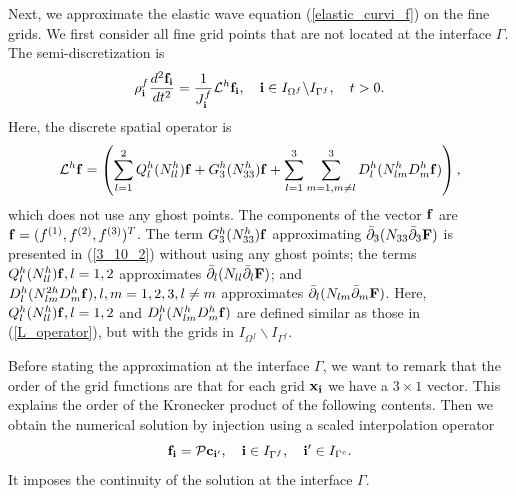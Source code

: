 Next, we approximate the elastic wave equation (\ref{elastic_curvi_f}) on the fine grids. We first consider all fine grid points that are not located at the interface $\Gamma$. The semi-discretization  is
\begin{equation}\label{elastic_semi_f}
{\rho}_{\bf i}^{f}\frac{d^2{{\bf f}_{\bf i}}}{dt^2} = \frac{1}{J^f_{\bf i}}{\mathcal{L}}^{h} {{\bf f}}_{\bf i},\quad {\bf i}\in I_{\Omega^f}\backslash I_{{\Gamma^f}},\quad t>0.
\end{equation}
Here, the discrete spatial operator is
\begin{equation}\label{Lf_operator}
{\mathcal{L}}^{h} {{\bf f}} = \left(\sum_{l=1}^2{Q}_l^{h}({N}_{ll}^h){\bf f}+{G}_3^{h}({N}_{33}^h){\bf f}+\sum_{l=1}^3\sum_{m=1,m\neq l}^3{D}_l^{h}({N}_{lm}^{h}{D}_m^{h}{\bf f})\right),
\end{equation}
{\color{red} which does not use any ghost points. The components of the vector ${\bf f}$ are ${\bf f} = (f^{(1)}, f^{(2)}, f^{(3)})^T$. The term ${G}_3^{h}(N_{33}^{h}){\bf f}$ approximating $\bar{\partial}_3(N_{33}\bar{\partial}_3 {\bf F})$ is presented in (\ref{3_10_2}) without using any ghost points; the terms $Q_l^{h}(N_{ll}^{h}){\bf f}, l = 1,2$ approximates $\bar{\partial}_l(N_{ll}\bar{\partial}_l{\bf F})$; and $D_{l}^{h}(N_{lm}^{2h}D_m^{h}{\bf f}), l,m = 1,2,3, l\neq m$ approximates  $\bar{\partial}_l(N_{lm}\bar{\partial}_m {\bf F})$. Here, ${Q}_l^{h}({N}_{ll}^h){\bf f}, l = 1,2$ and ${D}_l^{h}({N}_{lm}^{h}{D}_m^{h}{\bf f})$ are defined similar as those in (\ref{L_operator}), but with the grids in $I_{\Omega^f}\backslash I_{{\Gamma^f}}$.}

{\color{red} Before stating the approximation at the interface $\Gamma$, we want to remark that the order of the grid functions are that for each grid ${\bf x}_{\bf i}$ we have a $3\times 1$ vector. This explains the order of the Kronecker product of the following contents.} Then we obtain the numerical solution by injection using a scaled interpolation operator
\begin{equation}\label{continuous_sol}
{\bf f}_{\bf i} = {\mathcal{P}}{\bf c}_{{\bf i}'},\quad {\bf i}\in I_{\Gamma^f},\quad {{\bf i}'}\in I_{\Gamma^c}.
\end{equation}
It imposes the continuity of the solution at the interface $\Gamma$. 

